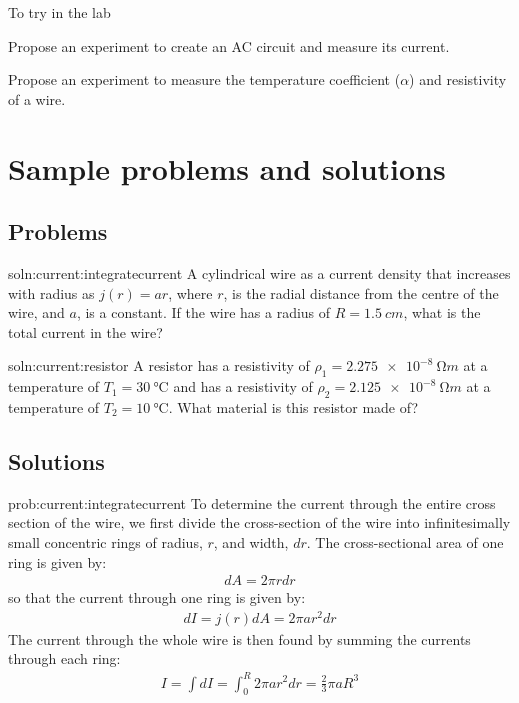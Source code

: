 \begin{chapteractivity}{To try in the lab}
{ 
\item Propose an experiment to create an AC circuit and measure its current.
\item Propose an experiment to measure the temperature coefficient ($\alpha$) and resistivity of a wire.
}
\end{chapteractivity}

\newpage
\section{Sample problems and solutions}



\subsection{Problems}
\begin{problem}{soln:current:integratecurrent}{\label{prob:current:integratecurrent}}
A cylindrical wire as a current density that increases with radius as $j(r) = ar$, where $r$, is the radial distance from the centre of the wire, and $a$, is a constant. If the wire has a radius of $R = \SI{1.5}{cm}$, what is the total current in the wire?
\end{problem}


\begin{problem}{soln:current:resistor}{\label{prob:current:resistor} 
A resistor has a resistivity of $\rho_1=\SI{2.275e-8}{\ohm m}$ at a temperature of $T_1=\SI{30}{\degreeCelsius}$ and has a resistivity of $\rho_2=\SI{2.125e-8}{\ohm m}$ at a temperature of $T_2=\SI{10}{\degreeCelsius}$. What material is this resistor made of?
}
\end{problem}


\newpage
\subsection{Solutions}
\begin{solution}{prob:current:integratecurrent}\label{soln:current:integratecurrent}
To determine the current through the entire cross section of the wire, we first divide the cross-section of the wire into infinitesimally small concentric rings of radius, $r$, and width, $dr$. The cross-sectional area of one ring is given by:
\begin{align*}
dA = 2\pi r dr
\end{align*}
so that the current through one ring is given by:
\begin{align*}
dI = j(r) dA = 2\pi a r^2 dr
\end{align*}
The current through the whole wire is then found by summing the currents through each ring:
\begin{align*}
I=\int dI = \int_0^R 2\pi a r^2 dr=\frac{2}{3}\pi aR^3
\end{align*}
\end{solution}


